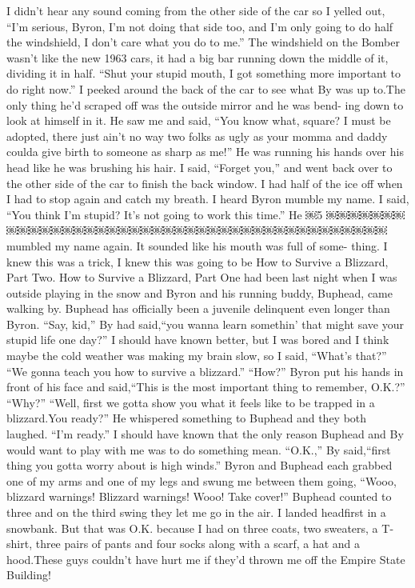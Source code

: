 \documentclass{standard}
\begin{document}
I didn’t hear any sound coming from the other side of the car so I yelled out, “I’m serious, Byron, I’m not doing that side too, and I’m only going to do half the windshield, I don’t care what you do to me.” The windshield on the Bomber wasn’t like the new 1963 cars, it had a big bar running down the middle of it, dividing it in half.
“Shut your stupid mouth, I got something more important to do right now.”
I peeked around the back of the car to see what By was up to.The only thing he’d scraped off was the outside mirror and he was bend- ing down to look at himself in it. He saw me and said, “You know what, square? I must be adopted, there just ain’t no way two folks as ugly as your momma and daddy coulda give birth to someone as sharp as me!”
He was running his hands over his head like he was brushing his hair.
I said, “Forget you,” and went back over to the other side of the car to finish the back window. I had half of the ice off when I had to stop again and catch my breath. I heard Byron mumble my name.
I said, “You think I’m stupid? It’s not going to work this time.” He
￼5
￼￼￼￼￼￼￼￼￼￼￼￼￼￼￼￼￼￼￼￼￼￼￼￼￼￼￼￼￼￼￼￼￼￼￼￼￼￼￼￼￼mumbled my name again. It sounded like his mouth was full of some- thing. I knew this was a trick, I knew this was going to be How to Survive a Blizzard, Part Two.
How to Survive a Blizzard, Part One had been last night when I was outside playing in the snow and Byron and his running buddy, Buphead, came walking by. Buphead has officially been a juvenile delinquent even longer than Byron.
“Say, kid,” By had said,“you wanna learn somethin’ that might save your stupid life one day?”
I should have known better, but I was bored and I think maybe the cold weather was making my brain slow, so I said, “What’s that?”
“We gonna teach you how to survive a blizzard.”
“How?”
Byron put his hands in front of his face and said,“This is the most
important thing to remember, O.K.?” “Why?”
“Well, first we gotta show you what it feels like to be trapped in a blizzard.You ready?” He whispered something to Buphead and they both laughed.
“I’m ready.”
I should have known that the only reason Buphead and By would want to play with me was to do something mean.
“O.K.,” By said,“first thing you gotta worry about is high winds.”
Byron and Buphead each grabbed one of my arms and one of my legs and swung me between them going, “Wooo, blizzard warnings! Blizzard warnings! Wooo! Take cover!”
Buphead counted to three and on the third swing they let me go in the air. I landed headfirst in a snowbank.
But that was O.K. because I had on three coats, two sweaters, a T- shirt, three pairs of pants and four socks along with a scarf, a hat and a hood.These guys couldn’t have hurt me if they’d thrown me off the Empire State Building!
\end{document}
